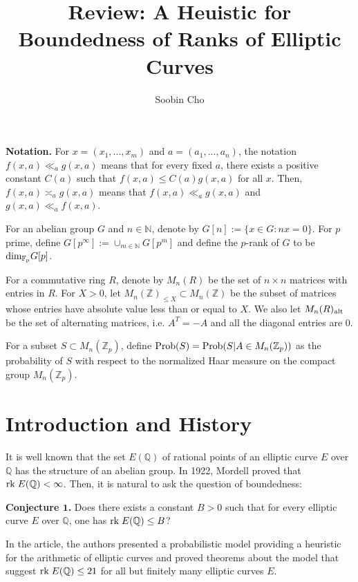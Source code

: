\documentclass[12pt,reqno]{amsart}
\numberwithin{equation}{section}
\def\Z{{\mathbb Z}}
\def\Q{{\mathbb Q}}
\def\F{{\mathbb F}}
\def\N{{\mathbb N}}
\begin{document}
\title
{ \bf Review: A Heuistic for Boundedness of Ranks of Elliptic Curves}
 \author{Soobin Cho}

\maketitle

{\bf Notation.} For $x=(x_1, ..., x_m)$ and $a=(a_1, ..., a_n)$, the notation $f(x,a) \ll_a g(x,a)$ means that for every fixed $a$, there exists a positive constant $C(a)$ such that $f(x,a) \le C(a) g(x,a)$ for all $x$. Then, $f(x,a) \asymp_a g(x,a)$ means that $f(x,a) \ll_a g(x,a)$ and $g(x,a) \ll_a f(x,a)$.

For an abelian group $G$ and $n \in \N$, denote by $G[n]:= \{x \in G : nx = 0 \}$. For $p$ prime, define $G[p^\infty]:= \cup_{m \in \N} G[p^m]$ and define the $p$-rank of $G$ to be ${\rm dim_{\F_p}} G[p]$.

For a commutative ring $R$, denote by $M_n(R)$ be the set of $n \times n$ matrices with entries in $R$. For $X >0$, let $M_n(\Z)_{\le X} \subset M_n(\Z)$ be the subset of matrices whose entries have absolute value less than or equal to $X$. We also let $M_n(R)_{\rm alt}$ be the set of alternating matrices, i.e. $A^T = -A$ and all the diagonal entries are $0$.

For a subset $S \subset M_n(\Z_p)$, define ${\rm Prob}(S) = {\rm Prob}(S | A \in M_n(\Z_p))$ as the probability of $S$ with respect to the normalized Haar measure on the compact group $M_n(\Z_p)$.


\section{Introduction and History}

It is well known that the set $E(\Q)$ of rational points of an elliptic curve $E$ over $\Q$ has the structure of an abelian group. In 1922, Mordell proved that ${\rm rk \;} E(\Q) < \infty$. Then, it is natural to ask the question of boundedness: 

\smallskip
{\bf Conjecture $\mathbf{1}$.} Does there exists a constant $B>0$  such that for every elliptic curve $E$ over $\Q$, one has ${\rm rk }\; E(\Q) \le B$?

\smallskip

In the article, the authors presented a probabilistic model providing a heuristic for the arithmetic of elliptic curves and proved theorems about the model that suggest  ${\rm rk \;} E(\Q) \le 21$ for all but finitely many elliptic curves $E$.
\end{document}
